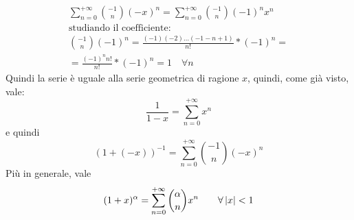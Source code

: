 \begin{itemize}
\begin{gather*}
		      \sum_{n=0}^{+\infty}\binom{-1}{n}(-x)^n=\sum_{n=0}^{+\infty}\binom{-1}{n}(-1)^nx^n\\
		      \text{studiando il coefficiente:}\\
		      \binom{-1}{n}(-1)^n=\frac{(-1)(-2)\dots(-1-n+1)}{n!}*(-1)^n=\\=\frac{(-1)^n n!}{n!}*(-1)^n=1\quad\forall n
	      \end{gather*}
	      Quindi la serie è uguale alla serie geometrica di ragione $x$, quindi, come già visto, vale:
	      \[
		      \frac{1}{1-x}=\sum_{n=0}^{+\infty}x^n
	      \]
	      e quindi
	      \[
		      (1+(-x))^{-1}=\sum_{n=0}^{+\infty}\binom{-1}{n}(-x)^n
	      \]
	      Più in generale, vale
	      \begin{equation}
		      (1+x)^\alpha=\sum_{n=0}^{+\infty}\binom{\alpha}{n} x^n\qquad\forall \left\lvert x \right\rvert<1
	      \end{equation}
\end{itemize}
